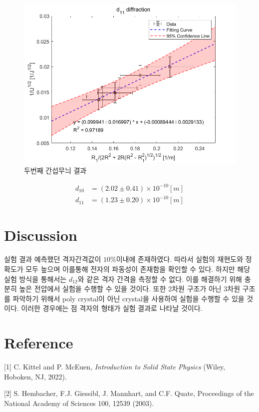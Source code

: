 \documentclass[%
 reprint,
 amsmath,amssymb,
 aps,
]{revtex4-2}
\begin{document}
\begin{figure}[htbp]
	\includegraphics[width = 0.95\linewidth]{Second.png}%
	\caption{\label{fig:Second}두번째 간섭무늬 결과}
\end{figure}

\begin{align}
	d_{10} &= (2.02\pm0.41)\times10^{-10} [m]\\
	d_{11} &= (1.23\pm0.20)\times10^{-10} [m]
\end{align}


\section{\label{sec:level1}Discussion}
실험 결과 예측했던 격자간격값이 $10\%$이내에 존재하였다. 따라서 실험의 재현도와 정확도가 모두 높으며 이를통해 전자의 파동성이 존재함을 확인할 수 있다. 하지만 해당 실험 방식을 통해서는 $d_{12}$와 같은 격자 간격을 측정할 수 없다. 이를 해결하기 위해 충분히 높은 전압에서 실험을 수행할 수 있을 것이다. 또한 2차원 구조가 아닌 3차원 구조를 파악하기 위해서 poly crystal이 아닌 crystal을 사용하여 실험을 수행할 수 있을 것이다. 이러한 경우에는 점 격자의 형태가 실험 결과로 나타날 것이다.

\section{\label{sec:level1}Reference}
[1] C. Kittel and P. McEuen, \textit{Introduction to Solid State Physics} (Wiley, Hoboken, NJ, 2022). 

[2] S. Hembacher, F.J. Giessibl, J. Mannhart, and C.F. Quate, Proceedings of the National Academy of Sciences 100, 12539 (2003). 
\end{document}
